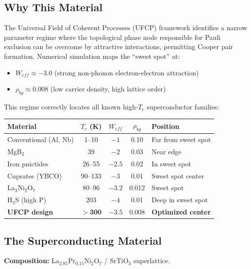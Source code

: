 \documentclass[11pt, a4paper]{article}
\begin{document}
\subsection{Why This Material}

The Universal Field of Coherent Processes (UFCP) framework
identifies a narrow parameter regime where the topological phase
node responsible for Pauli exclusion can be overcome by attractive
interactions, permitting Cooper pair formation. Numerical simulation
maps the ``sweet spot'' at:

\begin{itemize}[nosep]
  \item $W_{eff} \approx -3.0$ (strong non-phonon electron-electron
        attraction)
  \item $\rho_{bg} \approx 0.008$ (low carrier density, high lattice
        order)
\end{itemize}

This regime correctly locates all known high-$T_c$ superconductor
families:

\begin{center}
\begin{tabular}{@{}lcccl@{}}
\toprule
\textbf{Material} & $T_c$ (K) & $W_{eff}$ & $\rho_{bg}$ &
  \textbf{Position} \\
\midrule
Conventional (Al, Nb) & 1--10 & $-1$ & 0.10 & Far from sweet spot \\
MgB$_2$ & 39 & $-2$ & 0.03 & Near edge \\
Iron pnictides & 26--55 & $-2.5$ & 0.02 & In sweet spot \\
Cuprates (YBCO) & 90--133 & $-3$ & 0.01 & Sweet spot center \\
La$_3$Ni$_2$O$_7$ & 80--96 & $-3.2$ & 0.012 & Sweet spot \\
H$_3$S (high P) & 203 & $-4$ & 0.01 & Deep in sweet spot \\
\textbf{UFCP design} & \textbf{$>$300} & $\mathbf{-3.5}$ &
  $\mathbf{0.008}$ & \textbf{Optimized center} \\
\bottomrule
\end{tabular}
\end{center}

\subsection{The Superconducting Material}

\textbf{Composition:}
La$_{2.85}$Pr$_{0.15}$Ni$_2$O$_7$ / SrTiO$_3$ superlattice.
\end{document}
